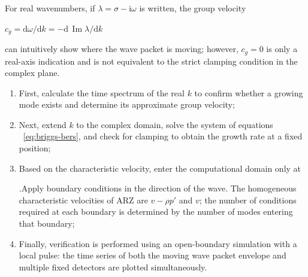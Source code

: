 \documentclass[11pt,a4paper,openany]{book}
\numberwithin{equation}{chapter}
\numberwithin{figure}{chapter}
\numberwithin{table}{chapter}
\newcommand{\cnemph}[1]{{\quotefont #1}}
\begin{document}
For real wavenumbers, if $\lambda=\sigma-\mathrm{i}\omega$ is written, the group velocity

$c_g=\mathrm d\omega/\mathrm dk=-\mathrm d\,\operatorname{Im}\lambda/\mathrm dk$

can intuitively show where the wave packet is moving; however, $c_g=0$ is only a real-axis indication and is not equivalent to the strict clamping condition in the complex plane.










\begin{tcolorbox}[notebox,title=\textbf{Actual Decision Sequence for Open Roads}]
\begin{enumerate}[leftmargin=1.6em,itemsep=2pt]
\item




 First, calculate the time spectrum of the real $k$ to confirm whether a growing mode exists and determine its approximate group velocity;







\item




 Next, extend $k$ to the complex domain, solve the system of equations ~\eqref{eq:briggs-bers}, and check for clamping to obtain the growth rate at a fixed position;







\item




Based on the characteristic velocity, enter the computational domain only at




\cnemph{.}Apply boundary conditions in the direction of the wave. The homogeneous characteristic velocities of ARZ are $v-\rho p'$ and $v$; the number of conditions required at each boundary is determined by the number of modes entering that boundary;







\item




Finally, verification is performed using an open-boundary simulation with a local pulse: the time series of both the moving wave packet envelope and multiple fixed detectors are plotted simultaneously.







\end{enumerate}
\end{tcolorbox}
\end{document}
